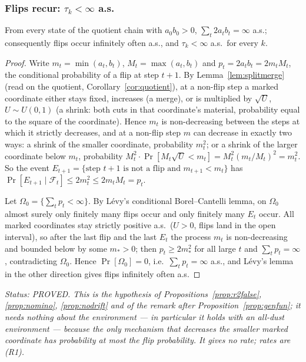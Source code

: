 \subsubsection{Flips recur: \texorpdfstring{$\tau_k<\infty$}{tau\_k<infty} a.s.}\label{sec:s13tau}

\begin{lemma}\label{lem:flipsrecur}
From every state of the quotient chain with $a_0b_0>0$,
$\sum_t2a_tb_t=\infty$ a.s.; consequently flips occur infinitely
often a.s., and $\tau_k<\infty$ a.s.\ for every $k$.
\end{lemma}

\begin{proof}
Write $m_t=\min(a_t,b_t)$, $M_t=\max(a_t,b_t)$ and
$p_t=2a_tb_t=2m_tM_t$, the conditional probability of a flip at step
$t+1$.  By Lemma~\ref{lem:splitmerge} (read on the quotient,
Corollary~\ref{cor:quotient}), at a non-flip step a marked coordinate
either stays fixed, increases (a merge), or is multiplied by
$\sqrt U$, $U\sim U(0,1)$ (a shrink: both cuts in that coordinate's
material, probability equal to the square of the coordinate).  Hence
$m_t$ is non-decreasing between the steps at which it strictly
decreases, and at a non-flip step $m$ can decrease in exactly two
ways: a shrink of the smaller coordinate, probability $m_t^2$; or a
shrink of the larger coordinate below $m_t$, probability
$M_t^2\cdot\Pr[M_t\sqrt U<m_t]=M_t^2(m_t/M_t)^2=m_t^2$.  So the event
$E_{t+1}=\{\text{step }t{+}1\text{ is not a flip and }m_{t+1}<m_t\}$
has $\Pr[E_{t+1}\mid\mathcal F_t]\le2m_t^2\le2m_tM_t=p_t$.

Let $\Omega_0=\{\sum_tp_t<\infty\}$.  By L\'evy's conditional
Borel--Cantelli lemma, on $\Omega_0$ almost surely only finitely many
flips occur and only finitely many $E_t$ occur.  All marked
coordinates stay strictly positive a.s.\ ($U>0$, flips land in the
open interval), so after the last flip and the last $E_t$ the process
$m_t$ is non-decreasing and bounded below by some $m_*>0$; then
$p_t\ge2m_*^2$ for all large $t$ and $\sum_tp_t=\infty$,
contradicting $\Omega_0$.  Hence $\Pr[\Omega_0]=0$, i.e.\
$\sum_tp_t=\infty$ a.s., and L\'evy's lemma in the other direction
gives flips infinitely often a.s.
\end{proof}

\emph{Status: PROVED.  This is the hypothesis of
Propositions~\ref{prop:r2false}, \ref{prop:nomino}, \ref{prop:nodrift}
and of the remark after Proposition~\ref{prop:genfun}; it needs
nothing about the environment --- in particular it holds with an
all-dust environment --- because the only mechanism that decreases the
smaller marked coordinate has probability at most the flip
probability.  It gives no rate; rates are (R1).}

